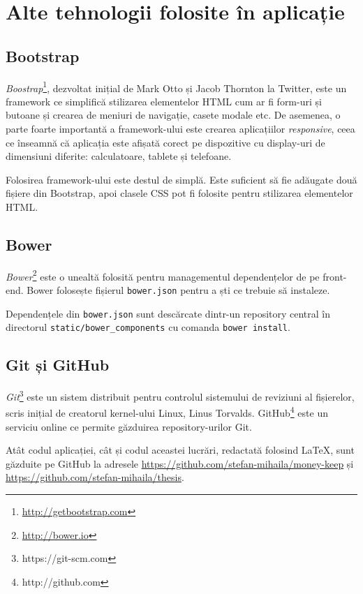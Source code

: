 \chapter{Alte tehnologii folosite în aplicație}

\section{Bootstrap}

\emph{Boostrap}\footnote{\url{http://getbootstrap.com}}, 
dezvoltat inițial de Mark Otto 
și Jacob Thornton la Twitter, este un framework ce simplifică stilizarea
elementelor HTML cum ar fi form-uri și butoane și crearea
de meniuri de navigație, casete modale etc. De asemenea,
o parte foarte importantă a framework-ului este crearea aplicațiilor
\emph{responsive}, ceea ce înseamnă că aplicația este afișată
corect pe dispozitive cu display-uri de dimensiuni diferite:
calculatoare, tablete și telefoane.

Folosirea framework-ului este destul de simplă. Este
suficient să fie adăugate două fișiere din Bootstrap,
apoi clasele CSS pot fi folosite pentru stilizarea
elementelor HTML.


\section{Bower}

\emph{Bower}\footnote{\url{http://bower.io}} este o unealtă
folosită pentru managementul dependențelor de pe front-end.
Bower folosește fișierul \texttt{bower.json} pentru a 
ști ce trebuie să instaleze.



Dependențele din \texttt{bower.json} sunt descărcate dintr-un
repository central în directorul \texttt{static/bower\_components}
cu comanda \texttt{bower install}.

\section{Git și GitHub}

\emph{Git}\footnote{https://git-scm.com} este un sistem distribuit
pentru controlul sistemului de reviziuni al fișierelor,
scris inițial de creatorul kernel-ului Linux, Linus Torvalds.
GitHub\footnote{http://github.com} este un serviciu
online ce permite găzduirea repository-urilor Git.

Atât codul aplicației, cât și codul aceastei lucrări, redactată folosind \LaTeX{},
sunt găzduite pe GitHub la adresele \url{https://github.com/stefan-mihaila/money-keep}
și \url{https://github.com/stefan-mihaila/thesis}.


